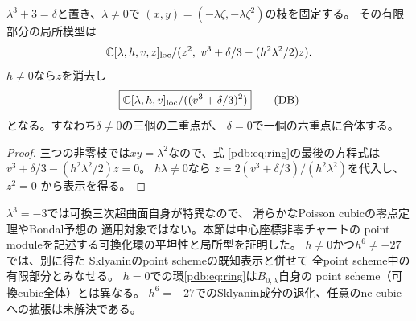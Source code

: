 \begin{corollary}[衝突の局所模型]\label{pdb:cor:double-cubic}
$\lambda^3+3=\delta$と置き、$\lambda\ne0$で
$(x,y)=(-\lambda\zeta,-\lambda\zeta^2)$の枝を固定する。
その有限部分の局所模型は
\[
 \mathbb C[\lambda,h,v,z]_{\rm loc}/
 (z^2,\ v^3+\delta/3-(h^2\lambda^2/2)z).
\]
$h\ne0$なら$z$を消去し
\[
\boxed{\mathbb C[\lambda,h,v]_{\rm loc}/((v^3+\delta/3)^2)}
\tag{DB}\label{pdb:eq:double-cubic}
\]
となる。すなわち$\delta\ne0$の三個の二重点が、
$\delta=0$で一個の六重点に合体する。
\end{corollary}
\begin{proof}
三つの非零枝では$xy=\lambda^2$なので、式
\eqref{pdb:eq:ring}の最後の方程式は
$v^3+\delta/3-(h^2\lambda^2/2)z=0$。
$h\lambda\ne0$なら
$z=2(v^3+\delta/3)/(h^2\lambda^2)$を代入し、$z^2=0$
から表示を得る。
\end{proof}

\begin{remark}[適用範囲]\label{pdb:rem:scope}
$\lambda^3=-3$では可換三次超曲面自身が特異なので、
滑らかなPoisson cubicの零点定理やBondal予想の
適用対象ではない。本節は中心座標非零チャートの
point moduleを記述する可換化環の平坦性と局所型を証明した。
$h\ne0$かつ$h^6\ne-27$では、別に得た
Sklyaninのpoint schemeの既知表示と併せて
全point scheme中の有限部分とみなせる。
$h=0$での環\eqref{pdb:eq:ring}は$B_{0,\lambda}$自身の
point scheme（可換cubic全体）とは異なる。
$h^6=-27$でのSklyanin成分の退化、任意のnc cubicへの拡張は未解決である。
\end{remark}
